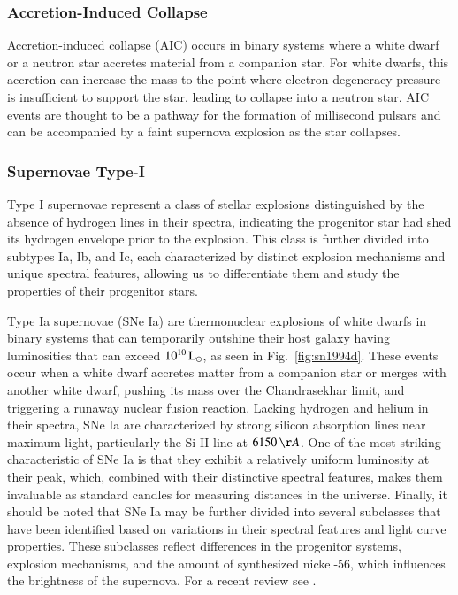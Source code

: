 \documentclass[main.tex]{subfiles}
\begin{document}
    \subsubsection{Accretion-Induced Collapse}
    Accretion-induced collapse (AIC) occurs in binary systems where a white dwarf or a neutron star accretes material from a companion star. For white dwarfs, this accretion can increase the mass to the point where electron degeneracy pressure is insufficient to support the star, leading to collapse into a neutron star. AIC events are thought to be a pathway for the formation of millisecond pulsars and can be accompanied by a faint supernova explosion as the star collapses.
    \subsubsection{Supernovae Type-I}
    Type I supernovae represent a class of stellar explosions distinguished by the absence of hydrogen lines in their spectra, indicating the progenitor star had shed its hydrogen envelope prior to the explosion. This class is further divided into subtypes Ia, Ib, and Ic, each characterized by distinct explosion mechanisms and unique spectral features, allowing us to differentiate them and study the properties of their progenitor stars.

    Type Ia supernovae (SNe Ia) are thermonuclear explosions of white dwarfs in binary systems that can temporarily outshine their host galaxy having luminosities that can exceed $10^{10}\mathrm{\,L_\odot}$, as seen in Fig.~\ref{fig:sn1994d}. These events occur when a white dwarf accretes matter from a companion star or merges with another white dwarf, pushing its mass over the Chandrasekhar limit, and triggering a runaway nuclear fusion reaction. Lacking hydrogen and helium in their spectra, SNe Ia are characterized by strong silicon absorption lines near maximum light, particularly the Si II line at $6150\,\AA$. One of the most striking characteristic of SNe Ia is that they exhibit a relatively uniform luminosity at their peak, which, combined with their distinctive spectral features, makes them invaluable as standard candles for measuring distances in the universe. Finally, it should be noted that SNe Ia may be further divided into several subclasses that have been identified based on variations in their spectral features and light curve properties. These subclasses reflect differences in the progenitor systems, explosion mechanisms, and the amount of synthesized nickel-56, which influences the brightness of the supernova. For a recent review see \cite{Liu_2023}.
\end{document}
